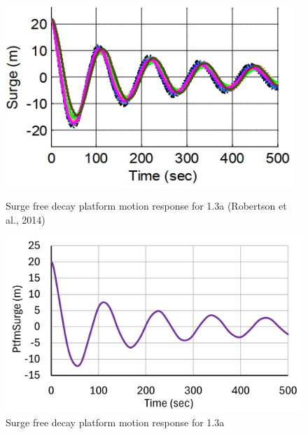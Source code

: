 \documentclass[a4paper]{article}
\begin{document}
\begin{figure}[H]
    \begin{minipage}{0.48\textwidth}
        \centering
        \includegraphics[width=0.97\textwidth]{1.3a_surge.png}
        \caption{\small Surge free decay platform motion response for 1.3a (Robertson et al., 2014)}
        \label{fig:1.3a_surge}
    \end{minipage}
    \hfill
    \begin{minipage}{0.49\textwidth}
        \centering
        \includegraphics[width=1\textwidth]{1.3a_surge_mine.png}
        \caption{\small Surge free decay platform motion response for 1.3a}
        \label{fig:1.3a_surge_mine}
    \end{minipage}
\end{figure}
\end{document}
